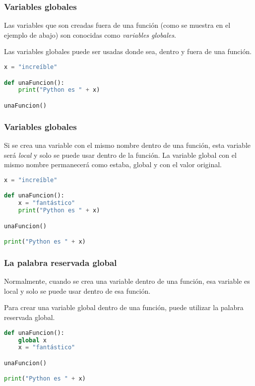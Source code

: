 \begin{frame}[fragile]
  \frametitle{Variables globales}

  Las variables que son creadas fuera de una función (como se muestra en el
  ejemplo de abajo) son conocidas como \emph{variables globales}.

  \vspace{\baselineskip}
  Las variables globales puede ser usadas donde sea, dentro y fuera de una
  función.

  \vspace{\baselineskip}
  \begin{lstlisting}[language=Python]
x = "increíble"

def unaFuncion():
    print("Python es " + x)

unaFuncion()
  \end{lstlisting}
\end{frame}

\begin{frame}[fragile]
  \frametitle{Variables globales}

  Si se crea una variable con el mismo nombre dentro de una función,
  esta variable será \emph{local} y solo se puede usar dentro de la función.
  La variable global con el mismo nombre permanecerá como estaba, global y
  con el valor original.

  \vspace{\baselineskip}
  \begin{lstlisting}[language=Python]
x = "increíble"

def unaFuncion():
    x = "fantástico"
    print("Python es " + x)

unaFuncion()

print("Python es " + x)
  \end{lstlisting}
\end{frame}

\begin{frame}[fragile]
  \frametitle{La palabra reservada \textbf{global}}

  Normalmente, cuando se crea una variable dentro de una función, esa
  variable es local y solo se puede usar dentro de esa función.

  \vspace{\baselineskip}
  Para crear una variable global dentro de una función, puede utilizar
  la palabra reservada \textcolor{codeKeyword}{global}.

  \vspace{\baselineskip}
  \begin{lstlisting}[language=Python]
def unaFuncion():
    global x
    x = "fantástico"

unaFuncion()

print("Python es " + x)
  \end{lstlisting}
\end{frame}

